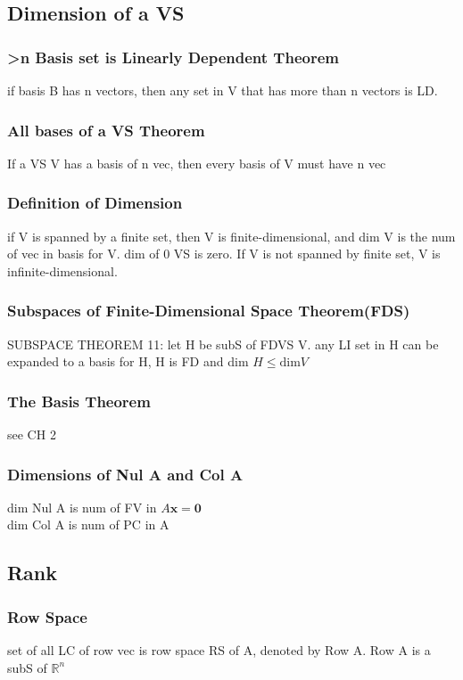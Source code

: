 \documentclass[12pt]{article}
\newcommand{\R}{\mathbb{R}}
\begin{document}
\subsection{Dimension of a VS}
    \subsubsection{>n Basis set is Linearly Dependent Theorem}
        if basis B has n vectors, then any set in V that has more 
        than n vectors is LD.
    \subsubsection{All bases of a VS Theorem}
        If a VS V has a basis of n vec, then every basis of V 
        must have n vec
    \subsubsection{Definition of Dimension}
        if V is spanned by a finite set, then V is finite-dimensional,
        and dim V is the num of vec in basis for V.
        dim of 0 VS is zero. If V is not spanned by finite set,
        V is infinite-dimensional.
    \subsubsection{Subspaces of Finite-Dimensional Space Theorem(FDS)}
        SUBSPACE THEOREM 11: let H be subS of FDVS V.
        any LI set in H can be expanded to a basis for H,
        H is FD and dim $H\le \text{dim} V$ 
    \subsubsection{The Basis Theorem}
        see CH 2
    \subsubsection{Dimensions of Nul A and Col A}
        dim Nul A is num of FV in $A\bm{x}= \bm{0}$  \\
        dim Col A is num of PC in A
\subsection{Rank}
    \subsubsection{Row Space}
        set of all LC of row vec is row space RS of A,
        denoted by Row A. Row A is a subS of $\R^n$ 
\end{document}
